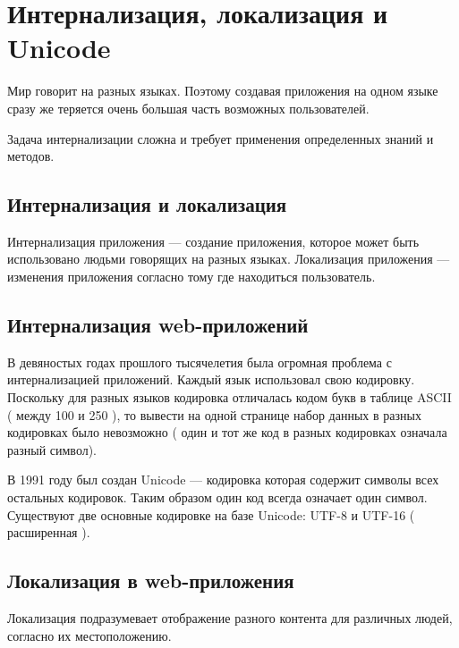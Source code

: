 \chapter{ Интернализация, локализация и Unicode } \label{chapt4}


Мир говорит на разных языках. Поэтому создавая приложения на одном языке сразу же теряется очень большая часть возможных пользователей.

Задача интернализации сложна и требует применения определенных знаний и методов.

\section{ Интернализация и локализация} \label{sect4_1}

 
 Интернализация приложения --- создание приложения, которое может быть использовано людьми говорящих на разных языках. Локализация приложения --- изменения приложения согласно тому где находиться пользователь.
 
 \section{ Интернализация web-приложений} \label{sect4_2}
 
 В девяностых годах прошлого тысячелетия была огромная проблема с интернализацией приложений. Каждый язык использовал свою кодировку. Поскольку для разных языков кодировка отличалась кодом букв в таблице ASCII ( между 100 и 250 ), то вывести на одной странице набор данных в разных кодировках было невозможно ( один и тот же код в разных кодировках означала разный символ).
 
 
 В 1991 году был создан Unicode --- кодировка которая содержит символы всех остальных кодировок. Таким образом один код всегда означает один символ. Существуют две основные кодировке на базе Unicode: UTF-8 и UTF-16 ( расширенная ).
 
\section{Локализация в web-приложения} \label{sect4_3}

Локализация подразумевает отображение разного контента для различных людей, согласно их местоположению.


